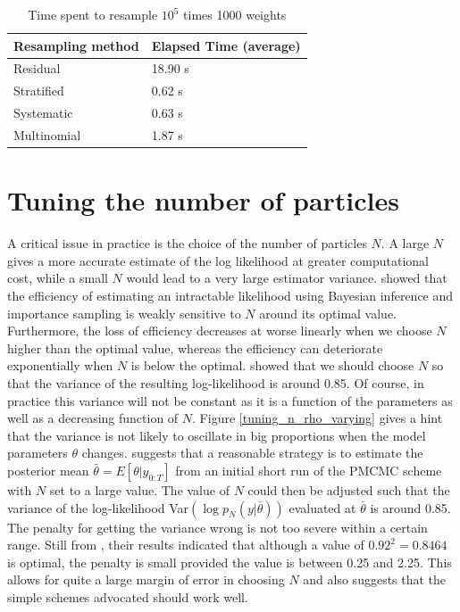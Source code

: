 \documentclass[11pt,a4,twosided,singlespacing,titlepagenumber=on]{scrreprt}
\numberwithin{equation}{chapter} %
\theoremstyle{remark}
\begin{document}
\begin{table}[H]
\centering
\begin{tabular}{ll}
\hline
\multicolumn{1}{|l|}{Resampling method}     & \multicolumn{1}{l|}{Elapsed Time (average)} \\ \hline
Residual 					   &  18.90 s \\
Stratified   				 &  0.62 s \\
Systematic   				 &  0.63 s \\
Multinomial          &  1.87 s \\
\hline
\end{tabular}
\caption{Time spent to resample $10^5$ times 1000 weights}
\label{resampling_method_table}
\end{table}

\section{Tuning the number of particles}
\label{sec:tuning_n}
A critical issue in practice is the choice of the number of particles $N$. A large $N$ gives a more accurate estimate of the log likelihood at greater computational cost, while a small $N$ would lead to a very large estimator variance. \cite{tran2014} showed that the efficiency of estimating an intractable likelihood using Bayesian inference and importance sampling is weakly sensitive to $N$ around its optimal value. Furthermore, the loss of efficiency decreases at worse linearly when we choose $N$ higher than the optimal value, whereas
the efficiency can deteriorate exponentially when $N$ is below the optimal. \cite{pitt2012} showed that we should choose $N$ so that the variance of the resulting log-likelihood is around 0.85. Of course, in practice this variance will not be constant as it is a function of the parameters as well as a decreasing function of $N$. Figure \ref{tuning_n_rho_varying} gives a hint that the variance is not likely to oscillate in big proportions when the model parameters $\theta$ changes. \cite{pitt2012} suggests that a reasonable strategy is to estimate the posterior mean $\bar{\theta} = E[\theta|y_{0:T}]$ from an initial short run of the PMCMC scheme with $N$ set to a large value. The value of $N$ could then be adjusted such that the variance of the log-likelihood Var$(\log p_N(y|\bar{\theta}))$ evaluated at $\bar{\theta}$ is around 0.85. The penalty for getting the variance wrong is not too severe within a certain range. Still from \cite{pitt2012}, their results indicated that although a value of $0.92^2 = 0.8464$ is optimal, the penalty is small provided the value is between 0.25 and 2.25. This allows for quite a large margin of error in choosing $N$ and also suggests that the simple schemes advocated should work well.
\end{document}

